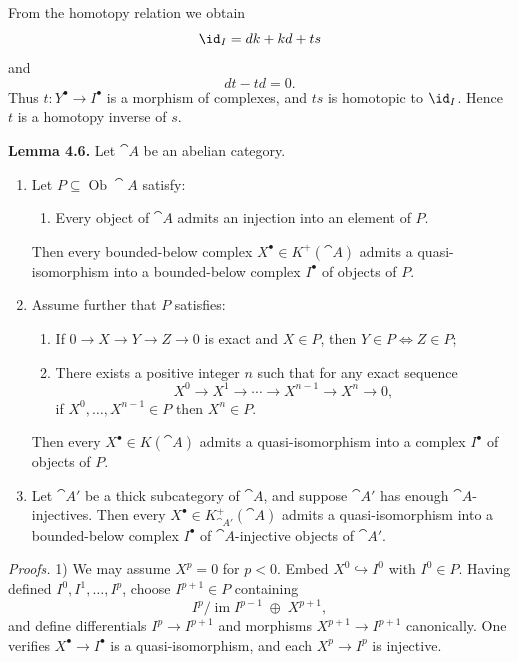 \setcounter{page}{42}
From the homotopy relation we obtain
\[
\id_I = dk + kd + ts
\]
and
\[
dt - td = 0.
\]
Thus \(t\colon Y^\bullet\to I^\bullet\) is a morphism of complexes, and \(ts\) is homotopic to \(\id_I\). Hence \(t\) is a homotopy inverse of \(s\).

\medskip
\textbf{Lemma 4.6.}
Let \(\cat{A}\) be an abelian category.
\begin{enumerate}
\item[1)] Let \(P\subseteq\operatorname{Ob}\cat{A}\) satisfy:
\begin{enumerate}
\item[(i)] Every object of \(\cat{A}\) admits an injection into an element of \(P\).
\end{enumerate}
Then every bounded-below complex \(X^\bullet\in K^+(\cat{A})\) admits a quasi-isomorphism into a bounded-below complex \(I^\bullet\) of objects of \(P\).

\item[2)] Assume further that \(P\) satisfies:
\begin{enumerate}
\item[(ii)] If \(0\to X\to Y\to Z\to 0\) is exact and \(X\in P\), then \(Y\in P\iff Z\in P\);
\item[(iii)] There exists a positive integer \(n\) such that for any exact sequence
\[
X^0\to X^1\to\cdots\to X^{n-1}\to X^n\to 0,
\]
if \(X^0,\dots,X^{n-1}\in P\) then \(X^n\in P\).
\end{enumerate}
Then every \(X^\bullet\in K(\cat{A})\) admits a quasi-isomorphism into a complex \(I^\bullet\) of objects of \(P\).

\item[3)] Let \(\cat{A}'\) be a thick subcategory of \(\cat{A}\), and suppose \(\cat{A}'\) has enough \(\cat{A}\)-injectives. Then every \(X^\bullet\in K_{\cat{A}'}^+(\cat{A})\) admits a quasi-isomorphism into a bounded-below complex \(I^\bullet\) of \(\cat{A}\)-injective objects of \(\cat{A}'\).
\end{enumerate}

\setcounter{page}{43}
\textit{Proofs.}
1) We may assume \(X^p=0\) for \(p<0\). Embed \(X^0\hookrightarrow I^0\) with \(I^0\in P\). Having defined \(I^0,I^1,\dots,I^p\), choose \(I^{p+1}\in P\) containing
\[
I^p\big/\operatorname{im}I^{p-1}\;\oplus\;X^{p+1},
\]
and define differentials \(I^p\to I^{p+1}\) and morphisms \(X^{p+1}\to I^{p+1}\) canonically. One verifies \(X^\bullet\to I^\bullet\) is a quasi-isomorphism, and each \(X^p\to I^p\) is injective.

